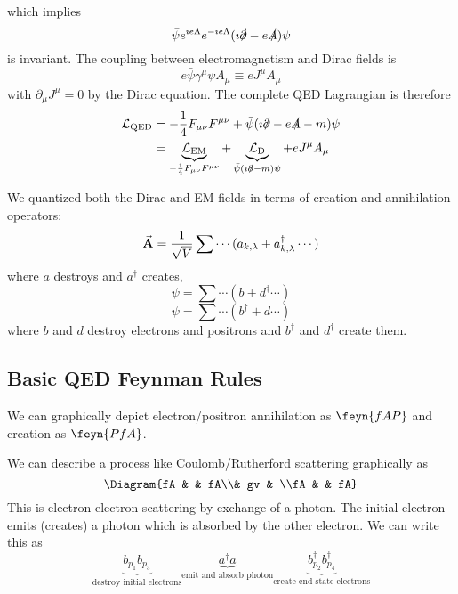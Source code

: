 \documentclass[a4paper,twoside,master.tex]{subfiles}
\begin{document}
which implies
\begin{equation}
    \bar{\psi} e^{\imath e \Lambda} e^{- \imath e \Lambda} (\imath \slashed{\partial} - e \slashed{A}) \psi
\end{equation}
is invariant. The coupling between electromagnetism and Dirac fields is
\begin{equation}
    e \bar{\psi} \gamma^{\mu} \psi A_{\mu} \equiv e J^{\mu} A_{\mu}
\end{equation}
with $ \partial_{\mu} J^{\mu} = 0 $ by the Dirac equation. The complete QED Lagrangian is therefore
\begin{align}
    \mathcal{L}_{\text{QED}} &= - \frac{1}{4} F_{\mu \nu} F^{\mu \nu} + \bar{\psi} (\imath \slashed{\partial} - e \slashed{A} - m) \psi \\
                             &= \underbrace{\mathcal{L}_{\text{EM}}}_{- \frac{1}{4} F_{\mu \nu} F^{\mu \nu}} + \underbrace{\mathcal{L}_{\text{D}}}_{\bar{\psi} (\imath \slashed{\partial} - m) \psi} + e J^{\mu} A_{\mu}
\end{align}

We quantized both the Dirac and EM fields in terms of creation and annihilation operators:
\begin{equation}
    \va{A} = \frac{1}{\sqrt{V}} \sum \cdots(a_{k, \lambda} + a^\dagger_{k, \lambda} \cdots)
\end{equation}
where $ a $ destroys and $ a^\dagger $ creates,
\begin{equation}
    \psi = \sum \cdots (b + d^\dagger \cdots)
\end{equation}
\begin{equation}
    \bar{\psi} = \sum \cdots(b^\dagger + d \cdots)
\end{equation}
where $ b $ and $ d $ destroy electrons and positrons and $ b^\dagger $ and $ d^\dagger $ create them.

\subsection{Basic QED Feynman Rules}\label{sub:basic_qed_feynman_rules}

We can graphically depict electron/positron annihilation as $ \feyn{fAP} $ and creation as $ \feyn{PfA} $.

We can describe a process like Coulomb/Rutherford scattering graphically as
\begin{equation}
    \Diagram{fA & & fA\\& gv & \\fA & & fA}
\end{equation}
This is electron-electron scattering by exchange of a photon. The initial electron emits (creates) a photon which is absorbed by the other electron. We can write this as
\begin{equation}
    \underbrace{b_{p_1} b_{p_3}}_{\text{destroy initial electrons}} \underbrace{a^\dagger a}_{\text{emit and absorb photon}} \underbrace{b^\dagger_{p_2} b^\dagger_{p_4}}_{\text{create end-state electrons}}
\end{equation}
\end{document}
